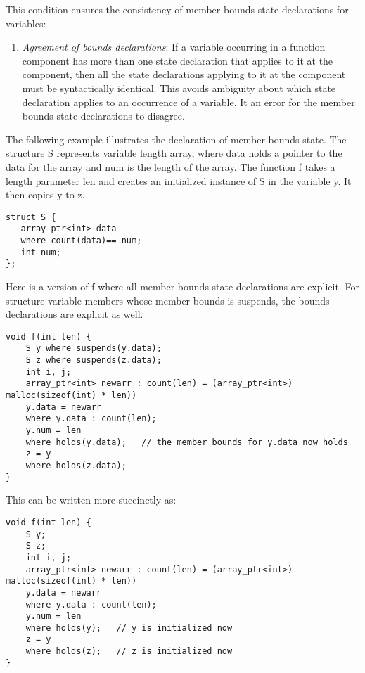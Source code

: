 This condition ensures the consistency of member bounds state
declarations for variables:

\begin{enumerate}
\item
  \emph{Agreement of bounds declarations}: If a variable occurring in a
  function component has more than one state declaration that applies to
  it at the component, then all the state declarations applying to it at
  the component must be syntactically identical. This avoids ambiguity
  about which state declaration applies to an occurrence of a variable.
  It an error for the member bounds state declarations to disagree.
\end{enumerate}

The following example illustrates the declaration of member bounds
state. The structure S represents variable length array, where data
holds a pointer to the data for the array and num is the length of the
array. The function f takes a length parameter len and creates an
initialized instance of S in the variable y. It then copies y to z.

\begin{verbatim}
struct S {
   array_ptr<int> data
   where count(data)== num;
   int num;
};
\end{verbatim}

Here is a version of f where all member bounds state declarations are
explicit. For structure variable members whose member bounds is
suspends, the bounds declarations are explicit as well.

\begin{verbatim}
void f(int len) {
    S y where suspends(y.data);
    S z where suspends(z.data);
    int i, j;
    array_ptr<int> newarr : count(len) = (array_ptr<int>) malloc(sizeof(int) * len))
    y.data = newarr
    where y.data : count(len);
    y.num = len
    where holds(y.data);   // the member bounds for y.data now holds
    z = y
    where holds(z.data);
}
\end{verbatim}

This can be written more succinctly as:

\begin{verbatim}
void f(int len) {
    S y;
    S z;
    int i, j;
    array_ptr<int> newarr : count(len) = (array_ptr<int>) malloc(sizeof(int) * len))
    y.data = newarr
    where y.data : count(len);
    y.num = len
    where holds(y);   // y is initialized now
    z = y
    where holds(z);   // z is initialized now
}
\end{verbatim}

